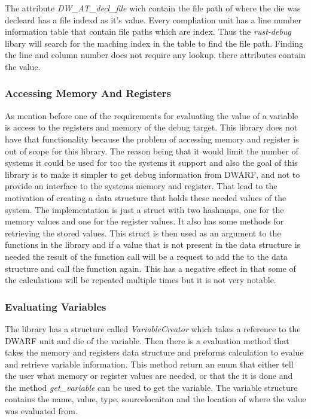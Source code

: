 The attribute  \emph{DW\_AT\_decl\_file} wich contain the file path of where the \gls{die} was decleard has a file indexd as it's value.
Every compliation unit has a line number information table that contain file paths which are index.
Thus the \emph{rust-debug} libary will search for the maching index in the table to find the file path.
Finding the line and column number does not require any lookup. there attributes contain the value.


\subsubsection{Accessing Memory And Registers}
As mention before one of the requirements for evaluating the value of a variable is access to the registers and memory of the debug target.
This library does not have that functionality because the problem of accessing memory and register is out of scope for this library.
The reason being that it would limit the number of systems it could be used for too the systems it support and also the goal of this library is to make it simpler to get debug information from \gls{DWARF}, and not to provide an interface to the systems memory and register.
That lead to the motivation of creating a data structure that holds these needed values of the system.
The implementation is just a struct with two hashmaps, one for the memory values and one for the register values.
It also has some methods for retrieving the stored values.
This struct is then used as an argument to the functions in the library and if a value that is not present in the data structure is needed the result of the function call will be a request to add the to the data structure and call the function again.
This has a negative effect in that some of the calculations will be repeated multiple times but it is not very notable.


\subsubsection{Evaluating Variables}
The library has a structure called \emph{VariableCreator} which  takes a reference to the \gls{DWARF} unit and die of the variable.
Then there is a evaluation method that takes the memory and registers data structure and preforms calculation to evalue and retrieve variable information.
This method return an enum that either tell the user what memory or register values are needed, or that the it is done and the method \emph{get\_variable} can be used to get the variable.
The variable structure contains the name, value, type, sourcelocaiton and the location of where the value was evaluated from.


